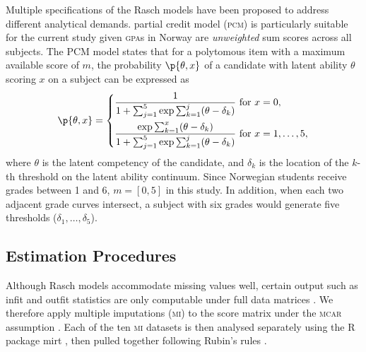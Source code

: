 Multiple specifications of the Rasch models have been proposed to address different analytical demands.  partial credit model (\textsc{pcm}) is particularly suitable for the current study given \textsc{gpa}s in Norway are \emph{unweighted} sum scores across all subjects. The PCM model states that for a polytomous item with a maximum available score of $m$, the probability $\p{\theta, x}$ of a candidate with latent ability $\theta$ scoring $x$ on a subject can be expressed as
\begin{equation}\label{eqn:rasch}
    \p{\theta, x} =
    \left\{
        \begin{aligned}
            & \frac{1}{1 + \sum_{j=1}^5 \exp{\sum_{k=1}^j (\theta - \delta_k)}}\ \text{for } x = 0, \\
            & \frac{\exp{\sum_{k=1}^x (\theta - \delta_k)}}{1 + \sum_{j=1}^5 \exp{\sum_{k=1}^j (\theta - \delta_k)}}\ \text{for } x = 1, \dots, 5,
        \end{aligned}
    \right.
\end{equation}
where $\theta$ is the latent competency of the candidate, and $\delta_k$ is the location of the $k$-th threshold on the latent ability continuum. Since Norwegian students receive grades between 1 and 6, $m = [0,5]$ in this study. In addition, when each two adjacent grade curves intersect, a subject with six grades would generate five thresholds ($\delta_1, \dots, \delta_5$).

\subsection{Estimation Procedures}

Although Rasch models accommodate missing values well, certain output such as infit and outfit statistics are only computable under full data matrices \parencite{chalmers:2022}. We therefore apply multiple imputations (\textsc{mi}) to the score matrix under the \textsc{mcar} assumption \parencite{little:2019}. Each of the ten \textsc{mi} datasets is then analysed separately using the \textsf{R} package \textsf{mirt} \parencite[Version 1.38.1,][]{chalmers:2022}, then pulled together following Rubin's rules \parencite{rubin:1987}.

